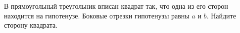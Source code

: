 \begin{ex}
	\begin{condition}
		В прямоугольный треугольник вписан квадрат так,	что одна из его сторон находится на гипотенузе. Боковые отрезки гипотенузы равны \( a  \) и \( b \). Найдите сторону квадрата.
	\end{condition}
\end{ex}